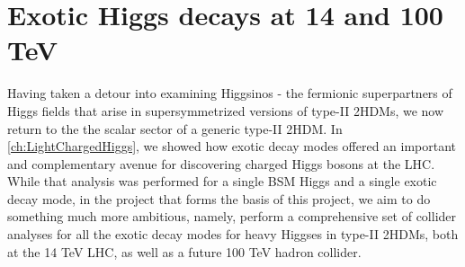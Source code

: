 \chapter{Exotic Higgs decays at 14 and 100 TeV}\label{ch:ExoticHiggs}

Having taken a detour into examining Higgsinos - the fermionic superpartners of Higgs fields that arise in supersymmetrized versions of type-II 2HDMs, we now return to the the scalar sector of a generic type-II 2HDM. In \autoref{ch:LightChargedHiggs}, we showed how exotic decay modes offered an important and complementary avenue for discovering charged Higgs bosons at the LHC. While that analysis was performed for a single BSM Higgs and a single exotic decay mode, in the project that forms the basis of this project, we aim to do something much more ambitious, namely, perform a comprehensive set of collider analyses for all the exotic decay modes for heavy Higgses in type-II 2HDMs, both at the 14 TeV LHC, as well as a future 100 TeV hadron collider.


